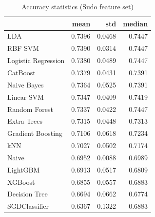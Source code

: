 \begin{table}
\caption{Accuracy statistics (Sudo feature set)}
\label{tab:accuracy_Sudo_stats}
\begin{tabular}{lrrr}
\toprule
 & mean & std & median \\
\midrule
LDA & 0.7396 & 0.0468 & 0.7447 \\
RBF SVM & 0.7390 & 0.0314 & 0.7447 \\
Logistic Regression & 0.7380 & 0.0489 & 0.7447 \\
CatBoost & 0.7379 & 0.0431 & 0.7391 \\
Naive Bayes & 0.7364 & 0.0525 & 0.7391 \\
Linear SVM & 0.7347 & 0.0409 & 0.7419 \\
Random Forest & 0.7337 & 0.0422 & 0.7447 \\
Extra Trees & 0.7315 & 0.0448 & 0.7313 \\
Gradient Boosting & 0.7106 & 0.0618 & 0.7234 \\
kNN & 0.7027 & 0.0502 & 0.7174 \\
Naive & 0.6952 & 0.0088 & 0.6989 \\
LightGBM & 0.6913 & 0.0517 & 0.6809 \\
XGBoost & 0.6855 & 0.0557 & 0.6883 \\
Decision Tree & 0.6694 & 0.0662 & 0.6774 \\
SGDClassifier & 0.6367 & 0.1322 & 0.6883 \\
\bottomrule
\end{tabular}
\end{table}
